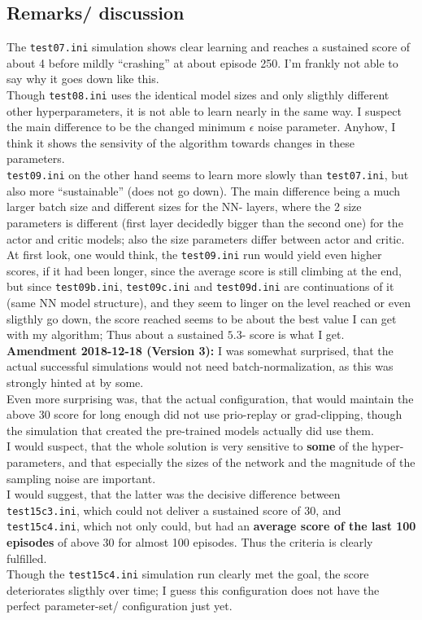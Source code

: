 \documentclass[a4paper]{article}
\begin{document}
\subsection{Remarks/ discussion}
The \texttt{test07.ini} simulation shows clear learning and reaches a sustained
score of about 4 before mildly \enquote{crashing} at about episode 250. I'm frankly
not able to say why it goes down like this.
\\
Though \texttt{test08.ini} uses the identical model sizes and only sligthly
different other hyperparameters, it is not able to learn nearly in the same
way. I suspect the main difference to be the changed minimum $\epsilon$ noise
parameter. Anyhow, I think it shows the sensivity of the algorithm towards
changes in these parameters.
\\
\texttt{test09.ini} on the other hand seems to learn more slowly than
\texttt{test07.ini}, but also more \enquote{sustainable} (does not go down).
The main difference being a much larger batch size and different sizes for
the NN- layers, where the 2 size parameters is different (first layer decidedly
bigger than the second one) for the actor and critic models; also the
size parameters differ between actor and critic.
\\
At first look, one would think, the \texttt{test09.ini} run would yield even
higher scores, if it had been longer, since the average score is still climbing
at the end, but since \texttt{test09b.ini}, \texttt{test09c.ini} and
\texttt{test09d.ini} are continuations of it (same NN model structure), and they
seem to linger on the level reached or even sligthly go down, the score
reached seems to be about the best value I can get with my algorithm;
Thus about a sustained $5.3$- score is what I get.
\\
\textbf{Amendment 2018-12-18 (Version 3):}
I was somewhat surprised, that the actual successful simulations would not
need batch-normalization, as this was strongly hinted at by some.
\\
Even more surprising was, that the actual configuration, that would maintain
the above 30 score for long enough did not use prio-replay or grad-clipping,
though the simulation that created the pre-trained models actually did use them.
\\
I would suspect, that the whole solution is very sensitive to \textbf{some} of
the hyper- parameters, and that especially the sizes of the network and the
magnitude of the sampling noise are important.
\\
I would suggest, that the latter was the decisive difference between
\texttt{test15c3.ini}, which could not deliver a sustained score of 30,
and \texttt{test15c4.ini}, which not only could, but had an
\textbf{average score of the last 100 episodes} of above 30 for almost
100 episodes. Thus the criteria is clearly fulfilled.
\\
Though the \texttt{test15c4.ini} simulation run clearly met the goal, the
score deteriorates sligthly over time; I guess this configuration does
not have the perfect parameter-set/ configuration just yet.
\end{document}
